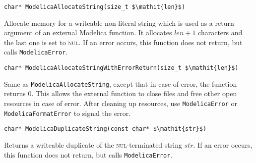 \begin{functiondefinition}[ModelicaAllocateString]
\begin{synopsis}[C]\begin{lstlisting}
char* ModelicaAllocateString(size_t $\mathit{len}$)
\end{lstlisting}\end{synopsis}
\begin{semantics}
Allocate memory for a writeable non-literal string which is used as a return argument of an external Modelica function.  It allocates $\mathit{len}+1$ characters and the last one is set to \textsc{nul}.  If an error occurs, this function does not return, but calls \lstinline[language=C]!ModelicaError!.
\end{semantics}
\end{functiondefinition}

\begin{functiondefinition}[ModelicaAllocateStringWithErrorReturn]
\begin{synopsis}[C]\begin{lstlisting}
char* ModelicaAllocateStringWithErrorReturn(size_t $\mathit{len}$)
\end{lstlisting}\end{synopsis}
\begin{semantics}
Same as \lstinline[language=C]!ModelicaAllocateString!, except that in case of error, the function returns 0.  This allows the external function to close files and free other open resources in case of error.  After cleaning up resources, use \lstinline[language=C]!ModelicaError! or \lstinline[language=C]!ModelicaFormatError! to signal the error.
\end{semantics}
\end{functiondefinition}

\begin{functiondefinition}[ModelicaDuplicateString]
\begin{synopsis}[C]\begin{lstlisting}
char* ModelicaDuplicateString(const char* $\mathit{str}$)
\end{lstlisting}\end{synopsis}
\begin{semantics}
Returns a writeable duplicate of the \textsc{nul}-terminated string $\mathit{str}$.  If an error occurs, this function does not return, but calls \lstinline[language=C]!ModelicaError!.
\end{semantics}
\end{functiondefinition}

